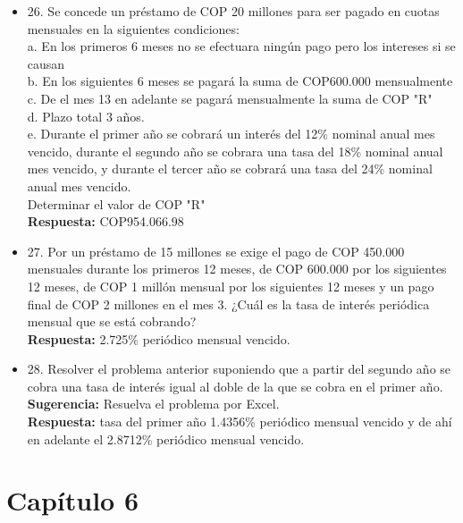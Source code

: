 \begin{itemize}
 \item 26. Se concede un préstamo de COP 20 millones para ser pagado en cuotas mensuales en la siguientes condiciones:\\
       a. En los primeros 6 meses no se efectuara ningún pago pero los intereses si se causan\\
       b. En los siguientes 6 meses se pagará la suma de COP600.000 mensualmente\\
       c. De el mes 13 en adelante se pagará mensualmente la suma de  COP  "R"\\
       d. Plazo total 3 años.\\
       e. Durante el primer año se cobrará un interés del 12\% nominal anual mes vencido, durante el segundo año se cobrara una tasa del 18\%  nominal anual mes vencido, y durante el tercer año se cobrará una tasa del 24\%  nominal anual mes vencido.\\
       Determinar el valor de  COP  "R"\\
       \textbf{Respuesta:} COP954.066.98\\
       \medskip

 \item 27. Por un préstamo de 15 millones se exige el pago de COP 450.000 mensuales durante los primeros 12 meses, de COP 600.000 por los siguientes 12 meses, de COP 1 millón mensual por los siguientes 12 meses y un pago final de COP 2 millones en el mes 3. ¿Cuál es la tasa de interés periódica mensual que se está cobrando?\\
       \textbf{Respuesta:} 2.725\% periódico mensual vencido.\\
       \medskip

 \item 28. Resolver el problema anterior suponiendo que a partir del segundo año se cobra una tasa de interés igual al doble de la que se cobra en el primer año.\\
       \textbf{Sugerencia:} Resuelva el problema por Excel.\\
       \textbf{Respuesta:} tasa del primer año 1.4356\% periódico mensual vencido y de ahí en adelante el 2.8712\% periódico mensual vencido.\\
       \medskip

\end{itemize}
\newpage


\chapter*{Capítulo 6}


